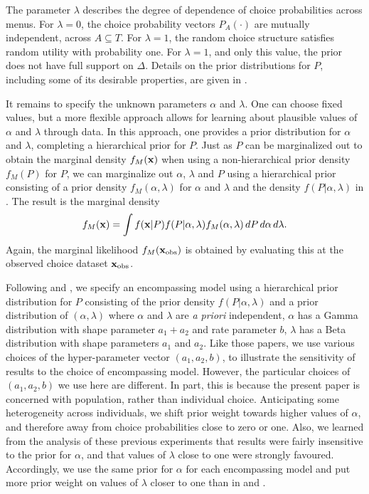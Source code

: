 \documentclass[11pt,letter]{article}
\newcommand{\menus}{menus}
\begin{document}
The parameter $\lambda$ describes the degree of dependence of choice probabilities across \menus{}.
For $\lambda = 0$, the choice probability vectors $P_A(\cdot)$ are mutually independent, across $A \subseteq T$.
For $\lambda = 1$, the random choice structure satisfies random utility with probability one.
For $\lambda = 1$, and only this value, the prior does not have full support on $\Delta$.
Details on the prior distributions for $P$, including some of its desirable properties, are given in .

It remains to specify the unknown parameters $\alpha$ and $\lambda$.
One can choose fixed values, but a more flexible approach allows for learning about plausible values of $\alpha$ and $\lambda$ through data.
In this approach, one provides a prior distribution for $\alpha$ and $\lambda$, completing a hierarchical prior for $P$.
Just as $P$ can be marginalized out to obtain the marginal density $f_M({\bf x})$ when using a non-hierarchical prior density $f_M(P)$ for $P$, we can marginalize out $\alpha$, $\lambda$ and $P$ using a hierarchical prior consisting of a prior density $f_M(\alpha,\lambda)$ for $\alpha$ and $\lambda$ and the density $f(P|\alpha,\lambda)$ in .
The result is the marginal density
\[
  f_M({\bf x}) = \int f({\bf x}|P) f(P|\alpha,\lambda) f_M(\alpha,\lambda) \, dP\, d\alpha\, d\lambda.
\]
Again, the marginal likelihood $f_M({\bf x}_{\mathrm{obs}})$ is obtained by evaluating this at the observed choice dataset ${\bf x}_{\mathrm{obs}}$.

Following  and , we specify an encompassing model using a hierarchical prior distribution for $P$ consisting of the prior density $f(P|\alpha,\lambda)$ and a prior distribution of $(\alpha,\lambda)$ where $\alpha$ and $\lambda$ are {\em a priori} independent, $\alpha$ has a Gamma distribution with shape parameter $a_1 + a_2$ and rate parameter $b$, $\lambda$ has a Beta distribution with shape parameters $a_1$ and $a_2$.
Like those papers, we use various choices of the hyper-parameter vector $(a_1,a_2,b)$, to illustrate the sensitivity of results to the choice of encompassing model.
However, the particular choices of $(a_1,a_2,b)$ we use here are different.
In part, this is because the present paper is concerned with population, rather than individual choice.
Anticipating some heterogeneity across individuals, we shift prior weight towards higher values of $\alpha$, and therefore away from choice probabilities close to zero or one.
Also, we learned from the analysis of these previous experiments that results were fairly insensitive to the prior for $\alpha$, and that values of $\lambda$ close to one were strongly favoured.
Accordingly, we use the same prior for $\alpha$ for each encompassing model and put more prior weight on values of $\lambda$ closer to one than in  and .
\end{document}
